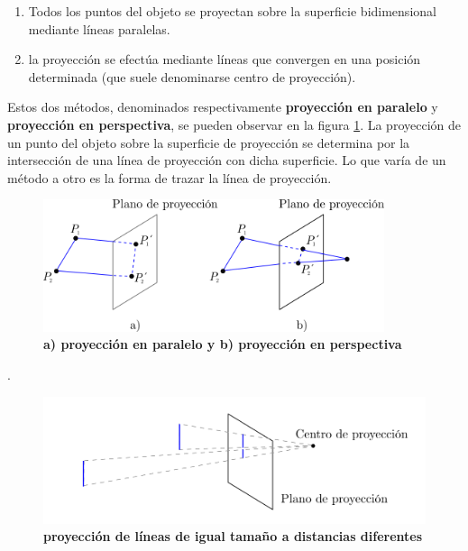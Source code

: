 \begin{enumerate}
    \item Todos los puntos del objeto se proyectan sobre la superficie bidimensional mediante líneas paralelas.
    
    \item la proyección se efectúa mediante líneas que convergen en una posición determinada (que suele denominarse centro de proyección).
\end{enumerate}
Estos dos métodos, denominados respectivamente \textbf{proyección en paralelo} y \textbf{proyección en perspectiva}, se pueden observar en la figura \ref{geo-per0}. La proyección de un punto del objeto sobre la superficie de proyección se determina por la intersección de una línea de proyección con dicha superficie. Lo que varía de un método a otro es la forma de trazar la línea de proyección.
\vspace{5mm}
\begin{figure}[h]
    \includegraphics[width=10cm]{Img/GEO/geo-per-0.png}
    \centering
    \caption{\footnotesize{\textbf{a) proyección en paralelo y b) proyección en perspectiva}}}
    \label{geo-per0}
\end{figure}

 \citep{Ramos2011}.

\begin{figure}[h]
    \includegraphics[width=12cm]{Img/GEO/geo-per-1.png}
    \centering
    \caption{\footnotesize{\textbf{proyección de líneas de igual tamaño a distancias diferentes}}}
    \label{geo-per1}
\end{figure}

